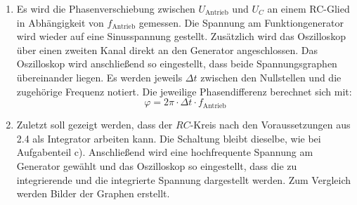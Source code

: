 \begin{enumerate}
    \item Es wird die Phasenverschiebung zwischen $U_{\text{Antrieb}}$ und $U_C$ an einem
    RC-Glied in Abhängigkeit von $f_{\text{Antrieb}}$ gemessen. Die Spannung am
    Funktiongenerator wird wieder auf eine Sinusspannung gestellt.
     Zusätzlich wird das Oszilloskop über einen zweiten Kanal direkt an den Generator angeschlossen.
     Das Oszilloskop wird anschließend so eingestellt, dass beide Spannungsgraphen
      übereinander liegen. Es werden jeweils $\Delta t$ zwischen den Nullstellen
      und die zugehörige Frequenz notiert. Die jeweilige
       Phasendifferenz berechnet sich mit:
       \begin{equation}
         \varphi = 2 \pi \cdot \Delta t \cdot f_{\text{Antrieb}}
       \end{equation}


       \item Zuletzt soll gezeigt werden, dass der $RC$-Kreis nach den Voraussetzungen aus 2.4 als
       Integrator arbeiten kann. Die Schaltung bleibt dieselbe, wie bei Aufgabenteil c).
       Anschließend wird eine hochfrequente Spannung am Generator gewählt und das Oszilloskop so eingestellt, dass
       die zu integrierende und die integrierte Spannung dargestellt werden. Zum Vergleich werden
       Bilder der Graphen erstellt.



\end{enumerate}
